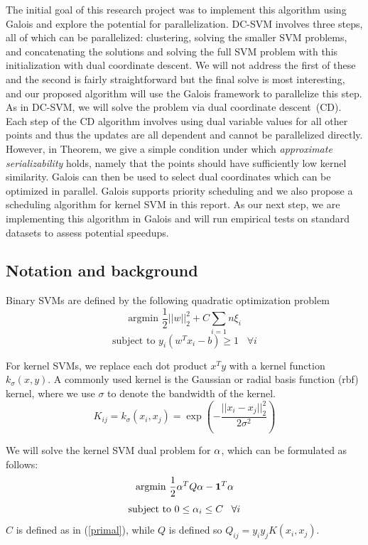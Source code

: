 The initial goal of this research project was to implement this algorithm using Galois and explore the potential for parallelization. 
DC-SVM involves three steps, all of which can be parallelized: clustering, solving the smaller SVM problems, and concatenating the solutions and solving the full SVM problem with this initialization with dual coordinate descent. 
We will not address the first of these and the second is fairly straightforward but the final solve is most interesting, and our proposed algorithm will use the Galois framework to parallelize this step. As in DC-SVM, we will solve the problem via dual coordinate descent~(CD). Each step of the CD algorithm involves using dual variable values for all other points and thus the updates are all dependent and cannot be parallelized directly. However, in Theorem, we give a simple condition under which \emph{approximate serializability} holds, namely that the points should have sufficiently low kernel similarity. Galois can then be used to select dual coordinates which can be optimized in parallel. Galois supports priority scheduling and we also propose a scheduling algorithm for kernel SVM in this report. As our next step, we are implementing this algorithm in Galois and will run empirical tests on standard datasets to assess potential speedups.

\subsection{Notation and background}
Binary SVMs are defined by the following quadratic optimization problem 
\begin{equation}
	\text{argmin } \frac{1}{2} ||w||_2^2 + C \sum_{i=1}{n} \xi_i
	\label{primal}
\end{equation}
\begin{equation}
	\text{subject to } y_i(w^T x_i - b) \geq 1 \,\,\,\,\, \forall i
	\label{primal_constraint}
\end{equation}

For kernel SVMs, we replace each dot product $ x^T y $ with a kernel function $k_{\sigma}(x,y)$. 
A commonly used kernel is the Gaussian or radial basis function (rbf) kernel, where we use $\sigma$ to denote the bandwidth of the kernel.
\[
	K_{ij} = k_{\sigma}(x_i,x_j) = \exp \left(-\frac{||x_i - x_j||^2_2}{2 \sigma^2}\right)
\]

We will solve the kernel SVM dual problem for $\alpha$, which can be formulated as follows:
\begin{equation}
	\text{argmin } \frac{1}{2} \alpha^T Q \alpha - \boldsymbol{1}^T \alpha
	\label{dual}
\end{equation}
\begin{equation}
	\text{subject to } 0 \leq \alpha_i \leq C \,\,\,\,\, \forall i
	\label{dual_constraint}
\end{equation}
$C$ is defined as in (\ref{primal}), while $Q$ is defined so $Q_{ij} = y_i y_j K(x_i,x_j)$.

